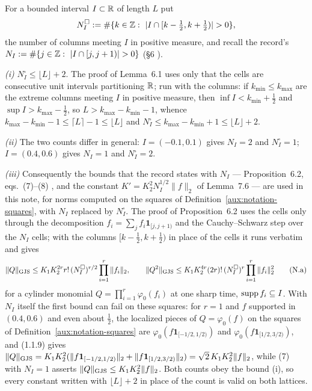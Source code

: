 \begin{auxrem}\label{aux:notation-counts}
For a bounded interval $I\subset\mathbb{R}$ of length $L$ put
\[
 N^{\square}_I:=\#\{k\in\Z:\ |I\cap[k-\tfrac12,k+\tfrac12)|>0\},
\]
the number of columns meeting $I$ in positive measure, and recall the record's
$N_I:=\#\{j\in\Z:\ |I\cap[j,j+1)|>0\}$ (\S6 \cite[p.~19]{R}).

\emph{(i)} $N^{\square}_I\le\lfloor L\rfloor+2$.  The proof of Lemma~6.1 \cite[p.~19]{R}
uses only that the cells are consecutive unit intervals partitioning $\mathbb{R}$; run with the
columns: if $k_{\min}\le k_{\max}$ are the extreme columns meeting $I$ in positive measure,
then $\inf I<k_{\min}+\frac12$ and $\sup I>k_{\max}-\frac12$, so
$L>k_{\max}-k_{\min}-1$, whence $k_{\max}-k_{\min}-1\le\lceil L\rceil-1\le\lfloor
L\rfloor$ and $N^{\square}_I\le k_{\max}-k_{\min}+1\le\lfloor L\rfloor+2$.

\emph{(ii)} The two counts differ in general: $I=(-0.1,0.1)$ gives $N_I=2$ and
$N^{\square}_I=1$; $I=(0.4,0.6)$ gives $N_I=1$ and $N^{\square}_I=2$.

\emph{(iii)} Consequently the bounds that the record states with $N_I$ --- Proposition~6.2,
eqs.~(7)--(8) \cite[p.~20]{R}, and the constant $K'=K_2^2N_I^{1/2}\|f\|_2$ of
Lemma~7.6 \cite[p.~22]{R} --- are used in this note, for norms computed on the squares of
Definition~\ref{aux:notation-squares}, with $N_I$ replaced by $N^{\square}_I$.  The proof of
Proposition~6.2 uses the cells only through the decomposition
$f_i=\sum_jf_i\mathbf 1_{[j,j+1)}$ and the Cauchy--Schwarz step over the $N_I$ cells; with
the columns $[k-\frac12,k+\frac12)$ in place of the cells it runs verbatim and gives
\[
 \lVert Q\rVert_{\mathrm{GJS}}\le K_1K_2^{2r}r!\,(N^{\square}_I)^{r/2}\prod_{i=1}^r\|f_i\|_2 ,\qquad
 \lVert Q^2\rVert_{\mathrm{GJS}}\le K_1K_2^{4r}(2r)!\,(N^{\square}_I)^{r}\prod_{i=1}^r\|f_i\|_2^2
 \tag{N.a}
\]
for a cylinder monomial $Q=\prod_{i=1}^r\varphi_0(f_i)$ at one sharp time, $\operatorname{supp}
f_i\subseteq I$.  With $N_I$ itself the first bound can fail on these squares: for $r=1$ and
$f$ supported in $(0.4,0.6)$ and even about $\frac12$, the localized pieces of
$Q=\varphi_0(f)$ on the squares of Definition~\ref{aux:notation-squares} are
$\varphi_0(f\mathbf 1_{[-1/2,1/2)})$ and $\varphi_0(f\mathbf 1_{[1/2,3/2)})$, and (1.1.9)
gives $\lVert Q\rVert_{\mathrm{GJS}}=K_1K_2^2(\|f\mathbf 1_{[-1/2,1/2)}\|_2+\|f\mathbf
1_{[1/2,3/2)}\|_2)=\sqrt2\,K_1K_2^2\|f\|_2$, while (7) with $N_I=1$ asserts
$\lVert Q\rVert_{\mathrm{GJS}}\le K_1K_2^2\|f\|_2$.  Both counts obey the bound (i), so every constant written
with $\lfloor L\rfloor+2$ in place of the count is valid on both lattices.
\end{auxrem}

